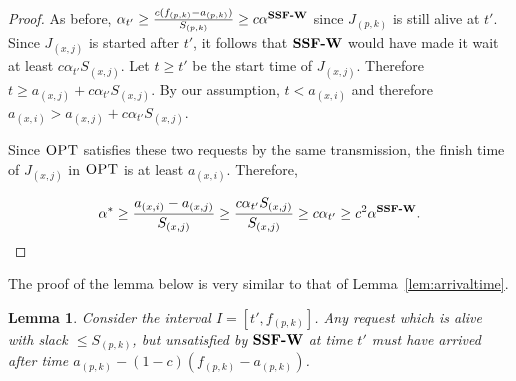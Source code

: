\documentclass[11pt]{article}
\newtheorem{lemma}{Lemma}[section]
\newcommand{\opt}{\textrm{\sc OPT}}
\newcommand{\st}{S} \newcommand{\Algorithm}[1]{{\texttt{\bf{#1}}}} \newcommand{\sbg}{\Algorithm{SSF-W}} \newcommand{\sug}{\Algorithm{SSF}} \newcommand{\mmug}{\Algorithm{SSF-ID}}
\begin{document}
\begin{proof}
  As before, $\alpha_{t'} \ge \frac{c(f_{(p,k)} -
    a_{(p,k)})}{\st_{(p,k)}} \ge c \alpha^{\sbg}$ since $J_{(p,k)}$ is
  still alive at $t'$. Since $J_{(x,j)}$ is started after $t'$, it
  follows that $\sbg$ would have made it wait at least $c \alpha_{t'}
  \st_{(x,j)}$. Let $t \ge t'$ be the start time of
  $J_{(x,j)}$. Therefore $t \ge a_{(x,j)} + c \alpha_{t'}
  \st_{(x,j)}$. By our assumption, $t < a_{(x,i)}$ and therefore
  $ a_{(x,i)} > a_{(x,j)} + c \alpha_{t'}\st_{(x,j)}$.

  Since $\opt$ satisfies these two requests by the same transmission,
  the finish time of $J_{(x,j)}$ in $\opt$ is at least $a_{(x,i)}$.
  Therefore,

\[
\alpha^* \ge \frac{a_{(x,i)} - a_{(x,j)}}{\st_{(x,j)}} \ge \frac{c
\alpha_{t'}  \st_{(x,j)}}{\st_{(x,j)}} \ge c \alpha_{t'} \ge c^2
\alpha^{\sbg}.
\]
\end{proof}


\iffalse
\begin{lemma}
\label{lem:varyingwork} Assume $\opt$ does not satisfy any two
requests in a single broadcast which $\sbg$ started satisfying in
separate broadcasts in $[t', f_i]$. $\opt$ must complete at least
${1 \over 2}$ the volume of work $\sbg$ completes on the interval
$[a_i + c(f_{(p,k)} - a_{(p,k)}), f_{(p,k)}]$.
\end{lemma}
\begin{proof}
  First, note that any request started in $[t', f_i]$ by $\sbg$, must
  also be finished by $\opt$.  This holds for all requests, even if
  the request is partially satisfied by $\sbg$ by time $f_{(p,k)}$.
  Consider a sequence of requests $J_{(x,i_1)}, J_{(x, i_2)}, \ldots,
  J_{(x, i_j)}$ such that $J_{(x,i_1)}$'s started being satisfied
  before time $t'$, $f_{(x,i_1))} \geq t'$, and each of the other
  requests started being satisfied in $[t', f_{(p,k)}]$ by separate
  broadcasts. By assumption, all of the requests $J_{(x, i_2)}, J_{(x,
    i_3)}, \ldots, J_{(x, i_j)}$ are satisfied by different broadcasts
  by $\opt$. Therefore, $\opt$ can only satisfy $J_{(x,i_1)}$ and
  $J_{(x, i_2)}$ by a single broadcast and the lemma follows.

\end{proof}
\fi

The proof of the lemma below is very similar to that
of Lemma~\ref{lem:arrivaltime}.
\begin{lemma}
  \label{lem:arrivaltimevarying}
  Consider the interval $I = [t', f_{(p,k)}]$. Any request which is
  alive with slack $\leq S_{(p,k)}$, but unsatisfied by $\sbg$ at time $t'$ must have arrived after
  time $a_{(p,k)} - (1-c)(f_{(p,k)} - a_{(p,k)})$.
\end{lemma}
\end{document}
